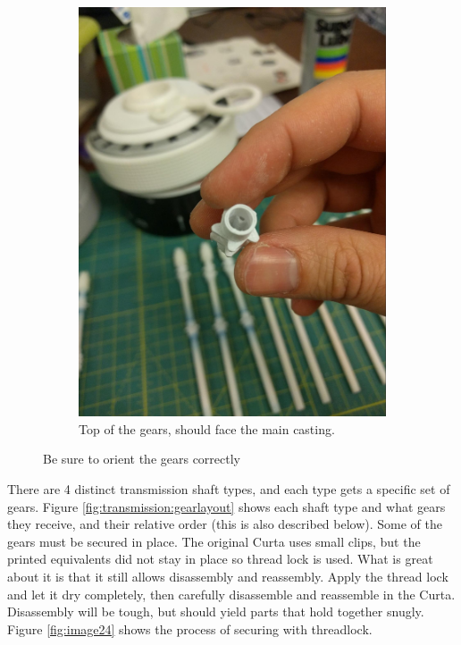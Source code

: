 \documentclass[openany]{book}
\begin{document}
\begin{figure}[!ht]
\begin{subfigure}{.46\textwidth}
		\includegraphics[width=.95\textwidth]{images/image38.jpg}
		\caption{Top of the gears, should face the main casting.}
		\label{fig:image38}	
	\end{subfigure}
 	\caption{Be sure to orient the gears correctly}
 	\label{fig:gearorient}
\end{figure}




There are 4 distinct transmission shaft types, and each type gets a specific set of gears. Figure
\ref{fig:transmission:gearlayout} shows each shaft type and what gears they receive, and their relative
order (this is also described below). Some of the gears must be secured in place. The original Curta uses small clips, but the printed equivalents did not stay in place so thread lock is used. What is great about it is that it still allows disassembly and reassembly. Apply the thread lock and let it dry completely, then carefully disassemble and reassemble in the Curta. Disassembly will be tough, but should yield parts that hold together snugly.
Figure \ref{fig:image24} shows the process of securing with threadlock.
\end{document}

